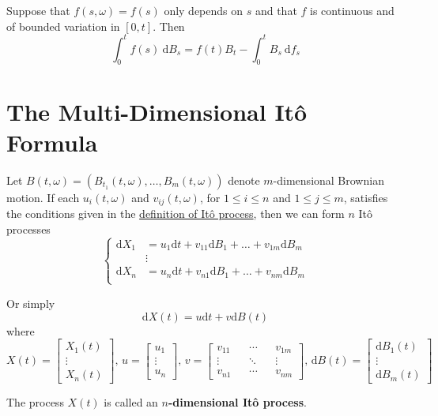 \begin{theorem}
    Suppose that $f(s, \omega) = f(s)$ only depends on $s$ and that $f$ is continuous and of bounded variation in $[0,t]$. Then 
    \begin{equation*}
        \int_0^t f(s) ~\mathrm{d}B_s = f(t) B_t - \int_0^t B_s ~\mathrm{d}f_s
    \end{equation*}
\end{theorem}

\section{The Multi-Dimensional Itô Formula}

\begin{definition}
    Let $B(t, \omega) = (B_{t_1}(t, \omega), \ldots , B_m(t, \omega))$ denote $m$-dimensional Brownian motion. If each $u_i(t, \omega)$ and $v_{ij}(t, \omega)$, for $1 \leq i \leq n$ and $1 \leq j \leq m$, satisfies the conditions given in the \hyperref[def:ito-process]{definition of Itô process}, then we can form $n$ Itô processes 
    \begin{equation*}
        \left\{\begin{aligned}
            \mathrm{d} X_1 &= u_1 \mathrm{d}t + v_{11}\mathrm{d}B_1 + \ldots + v_{1m}\mathrm{d}B_m \\
            &\vdots \\
            \mathrm{d} X_n &= u_n \mathrm{d}t + v_{n1}\mathrm{d}B_1 + \ldots + v_{nm}\mathrm{d}B_m \\ 
        \end{aligned}\right.
    \end{equation*}

    Or simply
    \[
        \mathrm{d}X(t) = u \mathrm{d}t + v \mathrm{d}B(t)
    \]
    where
    \[
        X(t) = \begin{bmatrix}
            X_1(t) \\
            \vdots \\
            X_n(t)
        \end{bmatrix}, \,
        u = \begin{bmatrix}
            u_1 \\
            \vdots \\
            u_n
        \end{bmatrix}, \,
        v = \begin{bmatrix}
            v_{11} && \cdots && v_{1m} \\
            \vdots && \ddots && \vdots \\
            v_{n1} && \cdots && v_{nm}
        \end{bmatrix}, \,
        \mathrm{d}B(t) = \begin{bmatrix}
            \mathrm{d}B_1(t) \\
            \vdots \\
            \mathrm{d}B_m(t)
        \end{bmatrix}
    \]

    The process $X(t)$ is called an \textbf{$n$-dimensional Itô process}.
\end{definition}

